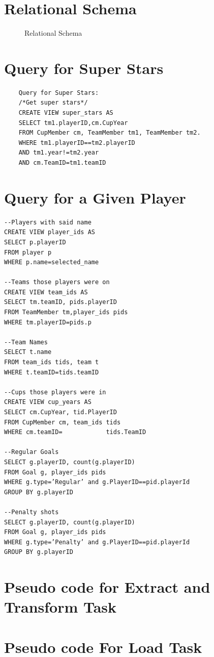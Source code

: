 \documentclass{article}
\begin{document}
\section{Relational Schema}
\begin{figure}[ph]
	\caption{Relational Schema}
	\label{relschema}
\end{figure}

\section{Query for Super Stars}
\begin{verbatim}
	Query for Super Stars:
	/*Get super stars*/
	CREATE VIEW super_stars AS
	SELECT tm1.playerID,cm.CupYear
	FROM CupMember cm, TeamMember tm1, TeamMember tm2.
	WHERE tm1.playerID==tm2.playerID
	AND tm1.year!=tm2.year
	AND cm.TeamID=tm1.teamID
\end{verbatim}

\section{Query for a Given Player}
\begin{verbatim}
--Players with said name
CREATE VIEW player_ids AS
SELECT p.playerID
FROM player p
WHERE p.name=selected_name

--Teams those players were on
CREATE VIEW team_ids AS
SELECT tm.teamID, pids.playerID
FROM TeamMember tm,player_ids pids
WHERE tm.playerID=pids.p

--Team Names
SELECT t.name
FROM team_ids tids, team t
WHERE t.teamID=tids.teamID

--Cups those players were in
CREATE VIEW cup_years AS
SELECT cm.CupYear, tid.PlayerID
FROM CupMember cm, team_ids tids
WHERE cm.teamID=            tids.TeamID

--Regular Goals
SELECT g.playerID, count(g.playerID)
FROM Goal g, player_ids pids
WHERE g.type=’Regular’ and g.PlayerID==pid.playerId
GROUP BY g.playerID

--Penalty shots
SELECT g.playerID, count(g.playerID)
FROM Goal g, player_ids pids
WHERE g.type=’Penalty’ and g.PlayerID==pid.playerId
GROUP BY g.playerID
\end{verbatim}

\section{Pseudo code for Extract and Transform Task}


\section{Pseudo code For Load Task}

\end{document}
